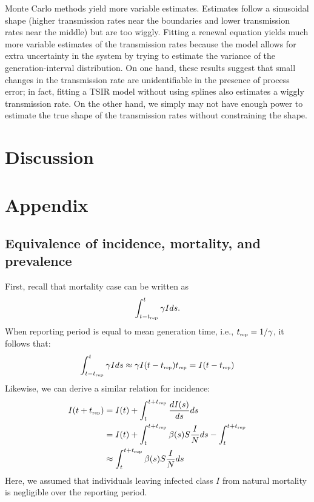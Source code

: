 \documentclass{article}
\newcommand{\tsub}[2]{#1_{{\textrm{\tiny #2}}}}
\begin{document}
Monte Carlo methods yield more variable estimates.
Estimates follow a sinusoidal shape (higher transmission rates near the boundaries and lower transmission rates near the middle) but are too wiggly.
Fitting a renewal equation yields much more variable estimates of the transmission rates because the model allows for extra uncertainty in the system by trying to estimate the variance of the generation-interval distribution.
On one hand, these results suggest that small changes in the transmission rate are unidentifiable in the presence of process error;
in fact, fitting a TSIR model without using splines also estimates a wiggly transmission rate.
On the other hand, we simply may not have enough power to estimate the true shape of the transmission rates without constraining the shape.

\section{Discussion}




\section{Appendix}

\subsection{Equivalence of incidence, mortality, and prevalence}

First, recall that mortality case can be written as
\begin{equation}
\int_{t-\tsub{t}{rep}}^{t} \gamma I ds.
\end{equation}
When reporting period is equal to mean generation time, i.e., $\tsub{t}{rep} = 1/\gamma$, 
it follows that:
\begin{equation}
\int_{t-\tsub{t}{rep}}^{t} \gamma I ds \approx \gamma I(t-\tsub{t}{rep}) \tsub{t}{rep} = I(t-\tsub{t}{rep})
\end{equation}
Likewise, we can derive a similar relation for incidence:
\begin{equation}
\begin{aligned}
I(t+\tsub{t}{rep}) &= I(t) + \int_{t}^{t+\tsub{t}{rep}} \frac{dI(s)}{ds} ds\\
&= I(t) + \int_{t}^{t+\tsub{t}{rep}} \beta(s) S \frac{I}{N} ds - \int_{t}^{t+\tsub{t}{rep}}\\
&\approx \int_{t}^{t+\tsub{t}{rep}} \beta(s) S \frac{I}{N} ds
\end{aligned}
\end{equation}
Here, we assumed that individuals leaving infected class $I$ from natural mortality is negligible over the reporting period.
\end{document}
